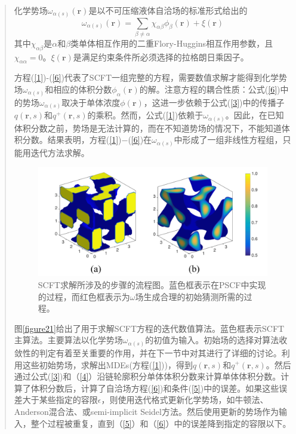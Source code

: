 \documentclass{article}
\begin{document}
\begin{CJK}{UTF8}{gkai}
\begin{quotation}
化学势场$\omega_{\alpha (s)}(\mathbf{r})$是以不可压缩液体自洽场的标准形式给出的
\begin{equation}\label{6}
\omega_{\alpha (s)}(\mathbf{r})=\sum _{\beta \neq \alpha} \chi_{\alpha \beta}\phi_{\beta}(\mathbf{r})+\xi(\mathbf{r})
\end{equation}
其中$\chi_{\alpha\beta}$是$\alpha$和$\beta$类单体相互作用的二重Flory-Huggins相互作用参数，且$\chi_{\alpha \alpha}=0$。$\xi(\mathbf{r})$是满足约束条件所必须选择的拉格朗日乘因子。

方程(\ref{1})-(\ref{6})代表了SCFT一组完整的方程，需要数值求解才能得到化学势场$\omega_{\alpha(s)}$和相应的体积分数$\phi_{\alpha}(\mathbf{r})$的解。注意方程的耦合性质：公式(\ref{6})中的势场$\omega_{\alpha(s)}$取决于单体浓度$\phi(\mathbf{r})$，这进一步依赖于公式(\ref{3})中的传播子$q(\mathbf{r},s)$和$q^{+}(\mathbf{r},s)$的乘积。然而，公式(\ref{1})依赖于$\omega_{\alpha (s)}$。因此，在已知体积分数之前，势场是无法计算的，而在不知道势场的情况下，不能知道体积分数。结果表明，方程(\ref{1})−(\ref{6})在$\omega_{\alpha (s)}$中形成了一组非线性方程组，只能用迭代方法求解。
\begin{figure}[H]
	\centering
	\includegraphics[scale=0.5]{./figures/22.png}
	\caption{SCFT求解所涉及的步骤的流程图。蓝色框表示在PSCF中实现的过程，而红色框表示为$\omega$场生成合理的初始猜测所需的过程。}
	\label{figure1}
\end{figure}
图\ref{figure21}给出了用于求解SCFT方程的迭代数值算法。蓝色框表示SCFT主算法。主要算法以化学势场$\omega_{\alpha (s)}$的初值为输入。初始场的选择对算法收敛性的判定有着至关重要的作用，并在下一节中对其进行了详细的讨论。利用这些初始势场，求解出MDEs(方程(\ref{1}))，得到$q(\mathbf{r},s)$和$q^{+}(\mathbf{r},s)$。然后通过公式(\ref{3})和（\ref{4}）沿链轮廓积分单体体积分数来计算单体体积分数。计算了体积分数后，计算了自洽场方程(\ref{6})和条件(\ref{5})中的误差。如果这些误差大于某些指定的容限$\epsilon$，则使用迭代格式更新化学势场，如牛顿法、Anderson混合法、或semi-implicit Seidel方法。然后使用更新的势场作为输入，整个过程被重复，直到（\ref{5}）和（\ref{6}）中的误差降到指定的容限以下。


\end{quotation}
\end{CJK}
\end{document}
